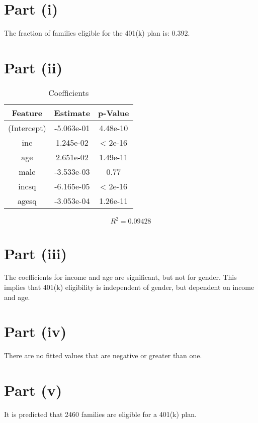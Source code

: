 \documentclass{./solution}
\begin{document}
    \begin{solution}[Wooldridge C7.9]
        \section*{Part (i)}
            The fraction of families eligible for the 401(k) plan is: 0.392.

        \section*{Part (ii)}
            \begin{table}[H]
                \caption{Coefficients}
                \begin{tabularx}{\textwidth}{C C C}
                    \toprule
                    Feature & Estimate & p-Value \\
                    \midrule
                    (Intercept) & -5.063e-01 &  4.48e-10 \\
                    inc         &  1.245e-02 &   < 2e-16 \\
                    age         &  2.651e-02 &  1.49e-11 \\
                    male        & -3.533e-03 &      0.77 \\
                    incsq       & -6.165e-05 &   < 2e-16 \\
                    agesq       & -3.053e-04 &  1.26e-11 \\
                    \bottomrule
                \end{tabularx}
            \end{table}
            \vspace{-5mm}
            $$ R^2 = 0.09428 $$

        \section*{Part (iii)}
            The coefficients for income and age are significant, but not for gender.
            This implies that 401(k) eligibility is independent of gender, but dependent on income and age.

        \section*{Part (iv)}
            There are no fitted values that are negative or greater than one.

        \section*{Part (v)}
            It is predicted that 2460 families are eligible for a 401(k) plan.


\end{solution}
\end{document}

